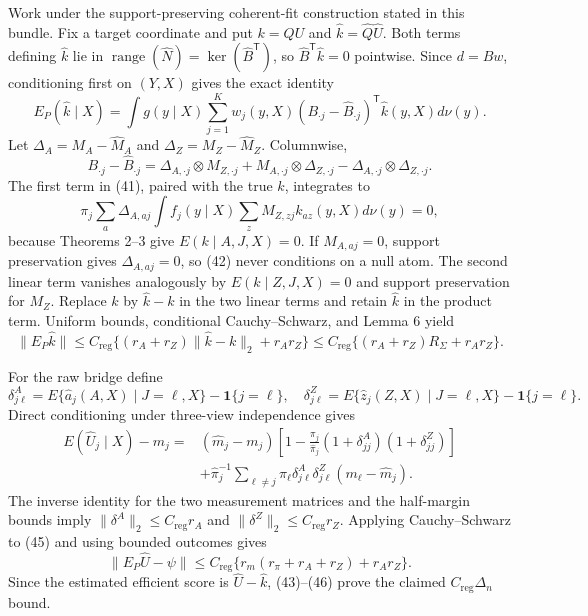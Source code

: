 Work under the support-preserving coherent-fit construction stated in this bundle.  Fix a target coordinate and put \(k=QU\) and \(\widehat k=\widehat Q\widehat U\).  Both terms defining \(\widehat k\) lie in \(\operatorname{range}(\widehat N)=\ker(\widehat B^{\mathsf T})\), so \(\widehat B^{\mathsf T}\widehat k=0\) pointwise.  Since \(d=Bw\), conditioning first on \((Y,X)\) gives the exact identity
\[
E_P(\widehat k\mid X)
=\int g(y\mid X)\sum_{j=1}^Kw_j(y,X)
 (B_{\cdot j}-\widehat B_{\cdot j})^{\mathsf T}\widehat k(y,X)d\nu(y). \tag{40}
\]
Let \(\Delta_A=M_A-\widehat M_A\) and \(\Delta_Z=M_Z-\widehat M_Z\).  Columnwise,
\[
B_{\cdot j}-\widehat B_{\cdot j}
=\Delta_{A,\cdot j}\otimes M_{Z,\cdot j}
+M_{A,\cdot j}\otimes\Delta_{Z,\cdot j}
-\Delta_{A,\cdot j}\otimes\Delta_{Z,\cdot j}. \tag{41}
\]
The first term in (41), paired with the true \(k\), integrates to
\[
\pi_j\sum_a\Delta_{A,aj}
 \int f_j(y\mid X)\sum_zM_{Z,zj}k_{az}(y,X)d\nu(y)=0, \tag{42}
\]
because Theorems 2--3 give \(E(k\mid A,J,X)=0\).  If \(M_{A,aj}=0\), support preservation gives \(\Delta_{A,aj}=0\), so (42) never conditions on a null atom.  The second linear term vanishes analogously by \(E(k\mid Z,J,X)=0\) and support preservation for \(M_Z\).  Replace \(k\) by \(\widehat k-k\) in the two linear terms and retain \(\widehat k\) in the product term.  Uniform bounds, conditional Cauchy--Schwarz, and Lemma 6 yield
\[
\|E_P\widehat k\|
\leq C_{\mathrm{reg}}\{(r_A+r_Z)\|\widehat k-k\|_2+r_Ar_Z\}
\leq C_{\mathrm{reg}}\{(r_A+r_Z)R_\Sigma+r_Ar_Z\}. \tag{43}
\]

For the raw bridge define
\[
\delta^A_{j\ell}=E\{\widehat a_j(A,X)\mid J=\ell,X\}-\mathbf 1\{j=\ell\},
\quad
\delta^Z_{j\ell}=E\{\widehat z_j(Z,X)\mid J=\ell,X\}-\mathbf 1\{j=\ell\}. \tag{44}
\]
Direct conditioning under three-view independence gives
\[
\begin{aligned}
E(\widehat U_j\mid X)-m_j
={}&(\widehat m_j-m_j)
\left[1-\frac{\pi_j}{\widehat\pi_j}
(1+\delta^A_{jj})(1+\delta^Z_{jj})\right]\\
&+\widehat\pi_j^{-1}\sum_{\ell\ne j}\pi_\ell
 \delta^A_{j\ell}\delta^Z_{j\ell}(m_\ell-\widehat m_j).
\end{aligned} \tag{45}
\]
The inverse identity for the two measurement matrices and the half-margin bounds imply
\(\|\delta^A\|_2\leq C_{\mathrm{reg}}r_A\) and
\(\|\delta^Z\|_2\leq C_{\mathrm{reg}}r_Z\).  Applying Cauchy--Schwarz to (45) and using bounded outcomes gives
\[
\|E_P\widehat U-\psi\|
\leq C_{\mathrm{reg}}\{r_m(r_\pi+r_A+r_Z)+r_Ar_Z\}. \tag{46}
\]
Since the estimated efficient score is \(\widehat U-\widehat k\), (43)--(46) prove the claimed \(C_{\mathrm{reg}}\Delta_n\) bound.


